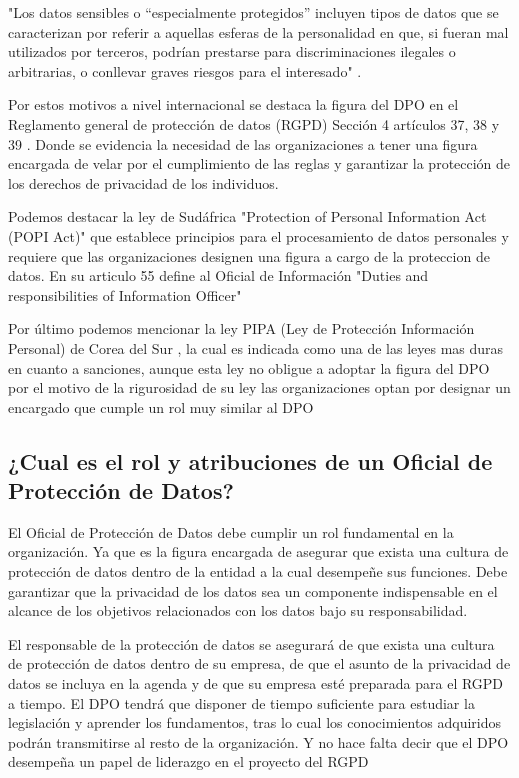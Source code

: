 \documentclass[stu, 11pt, letterpaper, donotrepeattitle, floatsintext, natbib]{apa7}
\begin{document}
"Los datos sensibles o “especialmente protegidos” incluyen tipos de datos que se caracterizan por referir a aquellas esferas de la personalidad en que, si fueran mal utilizados por terceros, podrían prestarse para discriminaciones ilegales o arbitrarias, o conllevar graves riesgos para el interesado" \citep*{DerechoInformatico}.

Por estos motivos a nivel internacional se destaca la figura del DPO en el Reglamento general de protección de datos (RGPD) Sección 4 artículos 37, 38 y 39 \citep{rgpd}. Donde se evidencia la necesidad de las organizaciones a tener una figura encargada de velar por el cumplimiento de las reglas y garantizar la protección de los derechos de privacidad de los individuos. 

Podemos destacar la ley de Sudáfrica "Protection of Personal Information Act (POPI Act)" \citep{sudafrica} que establece principios para el procesamiento de datos personales y requiere que las organizaciones designen una figura a cargo de la proteccion de datos. En su articulo 55 define al Oficial de Información "Duties and responsibilities of Information Officer" \citep{sudafrica2} 

Por último podemos mencionar la ley PIPA (Ley de Protección Información Personal) de Corea del Sur\citep{corea} , la cual es indicada como una de las leyes mas duras en cuanto a sanciones, aunque esta ley no obligue a adoptar la figura del DPO por el motivo de la rigurosidad de su ley las organizaciones optan por designar un encargado que cumple un rol muy similar al DPO \citep{corea2}

 

\subsection{¿Cual es el rol y atribuciones de un Oficial de Protección de Datos?}

El Oficial de Protección de Datos debe cumplir un rol fundamental en la organización. Ya que es la  figura encargada de asegurar que exista una cultura de protección de datos dentro de la entidad a la cual desempeñe sus funciones. Debe garantizar que la privacidad de los datos sea un componente indispensable en el alcance de los objetivos relacionados con los datos bajo su responsabilidad.


El responsable de la protección de
datos se asegurará de que exista una cultura de protección de datos dentro de su empresa,
de que el asunto de la privacidad de datos se incluya en la agenda y de que su empresa esté
preparada para el RGPD a tiempo. El DPO tendrá que disponer de tiempo suficiente para
estudiar la legislación y aprender los fundamentos, tras lo cual los conocimientos adquiridos
podrán transmitirse al resto de la organización. Y no hace falta decir que el DPO desempeña
un papel de liderazgo en el proyecto del RGPD
\end{document}
